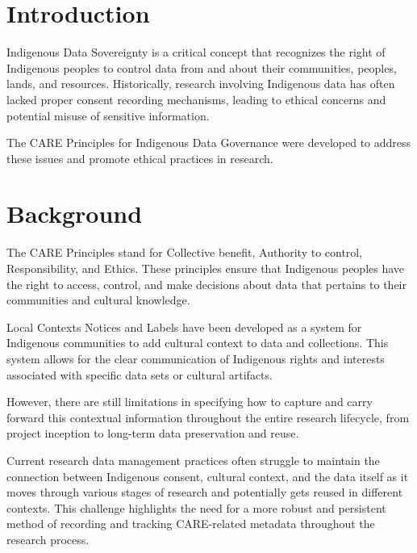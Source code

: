 \documentclass[a0,portrait]{a0poster}
\begin{document}
\begin{multicols}{2}


\color{ARDCPink}
\section*{\LARGE Introduction}
\color{DarkGrey}
\large{
Indigenous Data Sovereignty is a critical concept that recognizes the right of Indigenous peoples to control data from and about their communities, peoples, lands, and resources. Historically, research involving Indigenous data has often lacked proper consent recording mechanisms, leading to ethical concerns and potential misuse of sensitive information.

The CARE Principles for Indigenous Data Governance were developed to address these issues and promote ethical practices in research.
}

\color{ARDCYellow}
\section*{\LARGE Background}
\color{DarkGrey}
\large{
The CARE Principles stand for Collective benefit, Authority to control, Responsibility, and Ethics. These principles ensure that Indigenous peoples have the right to access, control, and make decisions about data that pertains to their communities and cultural knowledge.

Local Contexts Notices and Labels have been developed as a system for Indigenous communities to add cultural context to data and collections. This system allows for the clear communication of Indigenous rights and interests associated with specific data sets or cultural artifacts.

However, there are still limitations in specifying how to capture and carry forward this contextual information throughout the entire research lifecycle, from project inception to long-term data preservation and reuse.

Current research data management practices often struggle to maintain the connection between Indigenous consent, cultural context, and the data itself as it moves through various stages of research and potentially gets reused in different contexts. This challenge highlights the need for a more robust and persistent method of recording and tracking CARE-related metadata throughout the research process.
}


\end{multicols}
\end{document}

